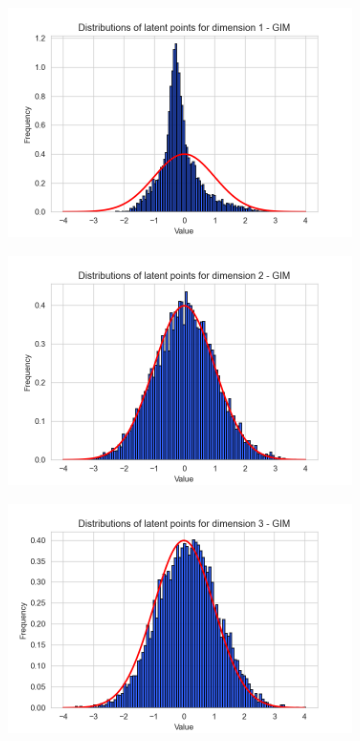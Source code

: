 \begin{figure}[h]
	\centering
	\begin{subfigure}[b]{0.25\textwidth}
		\centering
		\includegraphics[width=1\linewidth]{"graphs/distr/module1 kld0035/_ distribution_latent_space_GIM_dim=0"}
	\end{subfigure}
	\hfill
	\begin{subfigure}[b]{0.25\textwidth}
		\centering
		\includegraphics[width=1\linewidth]{"graphs/distr/module1 kld0035/_ distribution_latent_space_GIM_dim=1"}
	\end{subfigure}
	\hfill
	\begin{subfigure}[b]{0.25\textwidth}
		\centering
		\includegraphics[width=1\linewidth]{"graphs/distr/module1 kld0035/_ distribution_latent_space_GIM_dim=2"}

\end{subfigure}
\end{figure}

